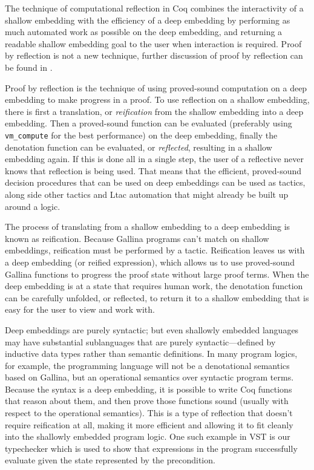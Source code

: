 \documentclass{puthesis}
\begin{document}
The technique of computational reflection in Coq combines the
interactivity of a shallow embedding with the efficiency of a deep
embedding by performing as much automated work as possible on the deep
embedding, and returning a readable shallow embedding goal to the user
when interaction is required. Proof by reflection is not a new
technique, further discussion of proof by
reflection can be found in \cite{chlipala2011certified, Bertot:2010:ITP:1965123}.

Proof by reflection is the technique of using proved-sound computation
on a deep embedding to make progress in a proof. To use reflection on
a shallow embedding, there is first a translation, or
\emph{reification} from the shallow embedding into a deep
embedding. Then a proved-sound function can be evaluated (preferably
using \lstinline|vm_compute| for the best performance) on the deep
embedding, finally the denotation function can be evaluated, or
\emph{reflected}, resulting in a shallow embedding again.  If this is
done all in a single step, the user of a reflective never knows that
reflection is being used. That means that the efficient, proved-sound
decision procedures that can be used on deep embeddings can be used as
tactics, along side other tactics and Ltac automation that might
already be built up around a logic.

The process of translating from a shallow embedding to a deep
embedding is known as reification. Because Gallina programs can't
match on shallow embeddings, reification must be performed by a
tactic. Reification leaves us with a deep embedding (or reified
expression), which allows us to use proved-sound Gallina functions to
progress the proof state without large proof terms. When the deep
embedding is at a state that requires human work, the denotation
function can be carefully unfolded, or reflected, to return it to a
shallow embedding that is easy for the user to view and work with.


Deep embeddings are purely syntactic; but even shallowly embedded
languages may have substantial sublanguages that are purely
syntactic---defined by inductive data types rather than semantic
definitions. In many program logics, for example, the programming
language will not be a denotational semantics based on Gallina, but an
operational semantics over syntactic program terms. Because the syntax
is a deep embedding, it is possible to write Coq functions that reason
about them, and then prove those functions sound (usually with respect
to the operational semantics). This is a type of reflection that
doesn't require reification at all, making it more efficient and
allowing it to fit cleanly into the shallowly embedded program
logic. One such example in VST is our typechecker which is used to
show that expressions in the program successfully evaluate given the
state represented by the precondition.
\end{document}
